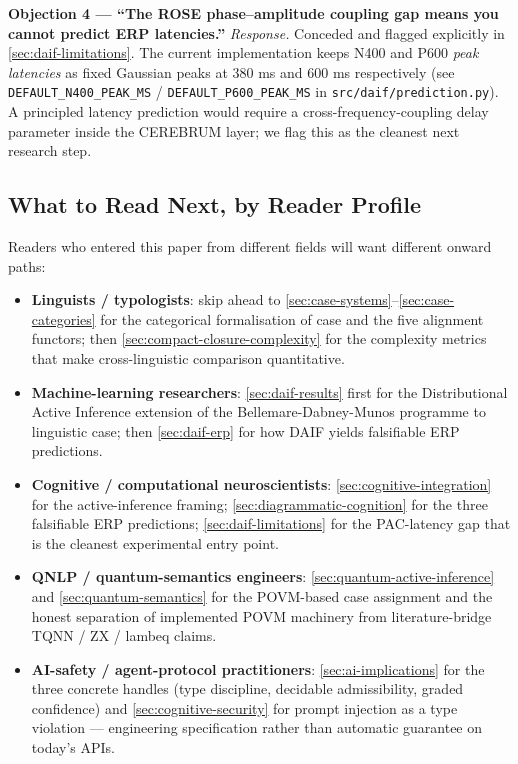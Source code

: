 \documentclass[
]{article}
\providecommand{\tightlist}{%
  \setlength{\itemsep}{0pt}\setlength{\parskip}{0pt}}
\begin{document}
\textbf{Objection 4 --- ``The ROSE phase--amplitude coupling gap means
you cannot predict ERP latencies.''} \emph{Response.} Conceded and
flagged explicitly in \autoref{sec:daif-limitations}. The current
implementation keeps N400 and P600 \emph{peak latencies} as fixed
Gaussian peaks at 380 ms and 600 ms respectively (see
\texttt{DEFAULT\_N400\_PEAK\_MS} / \texttt{DEFAULT\_P600\_PEAK\_MS} in
\texttt{src/daif/prediction.py}). A principled latency prediction would
require a cross-frequency-coupling delay parameter inside the CEREBRUM
layer; we flag this as the cleanest next research step.

\subsection{What to Read Next, by Reader
Profile}\label{what-to-read-next-by-reader-profile}

Readers who entered this paper from different fields will want different
onward paths:

\begin{itemize}
\tightlist
\item
  \textbf{Linguists / typologists}: skip ahead to
  \autoref{sec:case-systems}--\autoref{sec:case-categories} for the
  categorical formalisation of case and the five alignment functors;
  then \autoref{sec:compact-closure-complexity} for the complexity
  metrics that make cross-linguistic comparison quantitative.
\item
  \textbf{Machine-learning researchers}: \autoref{sec:daif-results}
  first for the Distributional Active Inference extension of the
  Bellemare-Dabney-Munos programme to linguistic case; then
  \autoref{sec:daif-erp} for how DAIF yields falsifiable ERP
  predictions.
\item
  \textbf{Cognitive / computational neuroscientists}:
  \autoref{sec:cognitive-integration} for the active-inference framing;
  \autoref{sec:diagrammatic-cognition} for the three falsifiable ERP
  predictions; \autoref{sec:daif-limitations} for the PAC-latency gap
  that is the cleanest experimental entry point.
\item
  \textbf{QNLP / quantum-semantics engineers}:
  \autoref{sec:quantum-active-inference} and
  \autoref{sec:quantum-semantics} for the POVM-based case assignment and
  the honest separation of implemented POVM machinery from
  literature-bridge TQNN / ZX / lambeq claims.
\item
  \textbf{AI-safety / agent-protocol practitioners}:
  \autoref{sec:ai-implications} for the three concrete handles (type
  discipline, decidable admissibility, graded confidence) and
  \autoref{sec:cognitive-security} for prompt injection as a type
  violation --- engineering specification rather than automatic
  guarantee on today's APIs.
\end{itemize}
\end{document}

